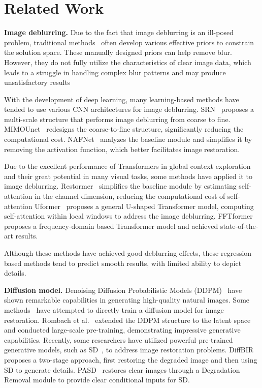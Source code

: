 \section{Related Work}
\label{Related Work}
{\flushleft \textbf{Image deblurring.}}
%
Due to the fact that image deblurring is an ill-posed problem, traditional methods~\cite{sparse,L0,dark_channel} often develop various effective priors to constrain the solution space.
%
These manually designed priors can help remove blur. 
%
However, they do not fully utilize the characteristics of clear image data, which leads to a struggle in handling complex blur patterns and may produce unsatisfactory results
%

%
With the development of deep learning, many learning-based methods have tended to use various CNN architectures for image deblurring. 
%
SRN~\cite{SRN} proposes a multi-scale structure that performs image deblurring from coarse to fine.
%
MIMOUnet~\cite{MIMO} redesigns the coarse-to-fine structure, significantly reducing the computational cost.
%
NAFNet~\cite{NAFNet} analyzes the baseline module and simplifies it by removing the activation function, which better facilitates image restoration.
%

%
Due to the excellent performance of Transformers in global context exploration and their great potential in many visual tasks, some methods have applied it to image deblurring.
%
Restormer~\cite{Restormer} simplifies the baseline module by estimating self-attention in the channel dimension, reducing the computational cost of self-attention
%
Uformer~\cite{Uformer} proposes a general U-shaped Transformer model, computing self-attention within local windows to address the image deblurring.
%
FFTformer~\cite{fftformer} proposes a frequency-domain based Transformer model and achieved state-of-the-art results.
%

%
Although these methods have achieved good deblurring effects, these regression-based methods tend to predict smooth results, with limited ability to depict details.
%


{\flushleft \textbf{Diffusion model.}}
%
Denoising Diffusion Probabilistic Models (DDPM)~\cite{DDPM} have shown remarkable capabilities in generating high-quality natural images.
%
Some methods~\cite{resshift,cdm,hidiff} have attempted to directly train a diffusion model for image restoration.
%
Rombach et al.~\cite{sd} extended the DDPM structure to the latent space and conducted large-scale pre-training, demonstrating impressive generative capabilities.
%
Recently, some researchers have utilized powerful pre-trained generative models, such as SD~\cite{sd}, to address image restoration problems.
%
DiffBIR~\cite{diffbir} proposes a two-stage approach, first restoring the degraded image and then using SD to generate details.
%
PASD~\cite{pasd} restores clear images through a Degradation Removal module to provide clear conditional inputs for SD.
%

